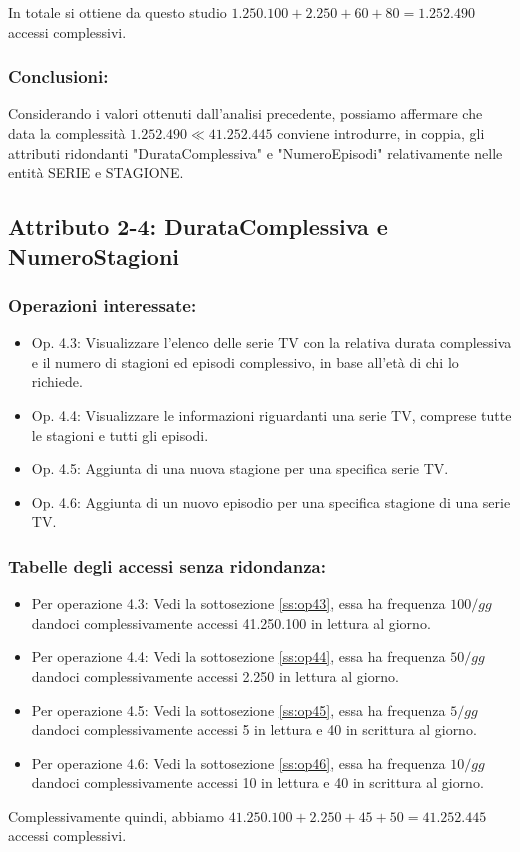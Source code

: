 \documentclass[a4paper,12pt]{report}
\begin{document}
In totale si ottiene da questo studio $1.250.100 + 2.250 + 60 + 80 = 1.252.490$ accessi complessivi.
\subsubsection{Conclusioni:}
Considerando i valori ottenuti dall'analisi precedente, possiamo affermare che data la complessità $1.252.490 \ll 41.252.445$ conviene introdurre, in coppia, gli attributi ridondanti "DurataComplessiva" e "NumeroEpisodi" relativamente nelle entità SERIE e STAGIONE.


\subsection{Attributo 2-4: DurataComplessiva e NumeroStagioni}
\subsubsection{Operazioni interessate:}
\begin{itemize}
	\item Op. 4.3: Visualizzare l’elenco delle serie TV con la relativa durata complessiva e il numero di stagioni ed episodi complessivo, in base all’età di chi lo richiede.
	\item Op. 4.4: Visualizzare le informazioni riguardanti una serie TV, comprese tutte le stagioni e tutti gli episodi.
	\item Op. 4.5: Aggiunta di una nuova stagione per una specifica serie TV.
	\item Op. 4.6: Aggiunta di un nuovo episodio per una specifica stagione di una serie TV.
\end{itemize}
\subsubsection{Tabelle degli accessi senza ridondanza:}
\begin{itemize}
	\item Per operazione 4.3: Vedi la sottosezione \ref{ss:op43}, essa ha frequenza $100/gg$ dandoci complessivamente accessi 41.250.100 in lettura al giorno.
	\item Per operazione 4.4: Vedi la sottosezione \ref{ss:op44}, essa ha frequenza $50/gg$ dandoci complessivamente accessi 2.250 in lettura al giorno.
	\item Per operazione 4.5: Vedi la sottosezione \ref{ss:op45}, essa ha frequenza $5/gg$ dandoci complessivamente accessi 5 in lettura e 40 in scrittura al giorno.
	\item Per operazione 4.6: Vedi la sottosezione \ref{ss:op46}, essa ha frequenza $10/gg$ dandoci complessivamente accessi 10 in lettura e 40 in scrittura al giorno.
\end{itemize}
Complessivamente quindi, abbiamo $41.250.100 + 2.250 + 45 + 50 = 41.252.445$ accessi complessivi.
\end{document}
